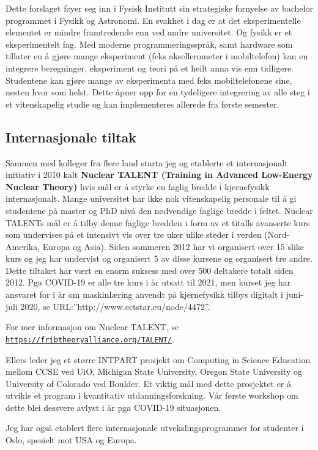 \documentclass[aps,floatfix,preprint]{revtex4-1}
\begin{document}
Dette forslaget føyer seg inn i Fysisk Institutt sin strategiske
fornyelse av bachelor programmet i Fysikk og Astronomi. En svakhet i
dag er at det eksperimentelle elementet er mindre framtredende enn ved
andre universitet. Og fysikk er et eksperimentelt fag. Med moderne
programmeringsspråk, samt hardware som tillater en å gjøre mange
eksperiment (feks aksellerometer i mobiltelefon) kan en integrere
beregninger, eksperiment og teori på et heilt anna vis enn
tidligere. Studentene kan gjøre mange av eksperimenta med feks
mobiltelefonene sine, nesten hvor som helst. Dette åpner opp for en tydeligere integrering av
alle steg i et vitenskapelig studie og kan implementeres allerede fra
første semester.

\subsection*{Internasjonale tiltak}
Sammen med kolleger fra flere land starta jeg og etablerte et
internasjonalt initiativ i 2010 kalt \textbf{Nuclear TALENT (Training in
Advanced Low-Energy Nuclear Theory)} hvis mål er å styrke
en faglig bredde i kjernefysikk internasjonalt. Mange universitet har
ikke nok vitenskapelig personale til å gi studentene på master og PhD
nivå den nødvendige faglige bredde i feltet. Nuclear TALENTs mål
er å tilby denne faglige bredden i form av et titalls avanserte kurs
som undervises på et intensivt vis over tre uker ulike steder i verden
(Nord-Amerika, Europa og Asia). Siden sommeren 2012 har vi organisert
over 15 slike kurs og jeg har undervist og organisert 5 av disse
kursene og organisert tre andre. Dette tiltaket har vært en enorm
suksess med over 500 deltakere totalt siden 2012. Pga COVID-19 er alle
tre kurs i år utsatt til 2021, men kurset jeg har ansvaret for i år om maskinlæring anvendt på kjernefysikk tilbys
digitalt i juni-juli 2020, se URL:''http://www.ectstar.eu/node/4472''.

For mer informasjon om Nuclear TALENT, se \href{{https://fribtheoryalliance.org/TALENT/}}{\nolinkurl{https://fribtheoryalliance.org/TALENT/}}.

Ellers leder jeg et større INTPART prosjekt om Computing in Science
Education mellom CCSE ved UiO, Michigan State University, Oregon State
University og University of Colorado ved Boulder. Et viktig mål med
dette prosjektet er å utvikle et program i kvantitativ utdanningsforskning. Vår
første workshop om dette blei  dessvere avlyst i år pga COVID-19 situasjonen.

Jeg har også etablert flere internasjonale utvekslingsprogrammer for
studenter i Oslo, spesielt mot USA og Europa.
\end{document}
